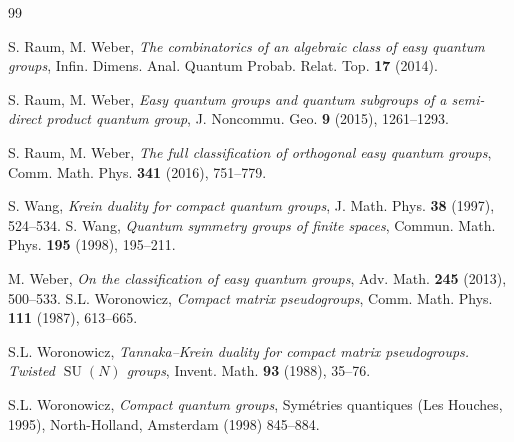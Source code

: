 \documentclass[12pt, a4paper]{amsart}
\def\SU{\operatorname{SU}}
\theoremstyle{definition}
\theoremstyle{remark}
\numberwithin{equation}{section}
\begin{document}
\begin{thebibliography}{99}


 S. Raum, M. Weber, \emph{The combinatorics of an algebraic class of easy quantum groups}, Infin. Dimens. Anal. Quantum Probab. Relat. Top. {\bf 17} (2014).
	
 S. Raum, M. Weber, \emph{Easy quantum groups and quantum subgroups of a semi-direct product quantum group}, J. Noncommu. Geo. {\bf 9} (2015), 1261--1293.

 S. Raum, M. Weber, \emph{The full classification of orthogonal easy quantum groups}, Comm. Math. Phys. {\bf 341} (2016), 751--779.
%	

%	
%	

 S. Wang, \emph{Krein duality for compact quantum groups}, J. Math. Phys. {\bf 38} (1997), 524--534.
%	
 S. Wang, \emph{Quantum symmetry groups of finite spaces}, Commun. Math. Phys. {\bf 195} (1998), 195--211.

 M. Weber, \emph{On the classification of easy quantum groups}, Adv. Math. {\bf 245} (2013), 500--533.
%	
%	
 S.L. Woronowicz, \emph{Compact matrix pseudogroups}, Comm. Math. Phys. {\bf 111} (1987), 613--665.

 S.L. Woronowicz, \emph{Tannaka--Krein duality for compact matrix pseudogroups. Twisted  $\operatorname{SU}(N)$ groups}, Invent. Math. {\bf 93} (1988), 35--76.
	
	 S.L. Woronowicz, \emph{Compact quantum groups}, Sym\'etries quantiques (Les Houches, 1995), North-Holland, Amsterdam (1998) 845--884.
%	
	
	
\end{thebibliography}
\end{document}
